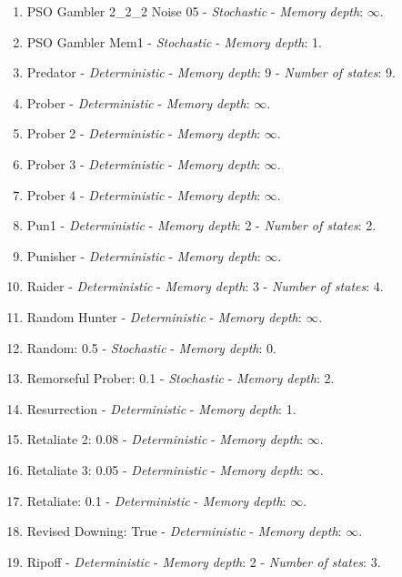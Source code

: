 \documentclass[10pt,letterpaper]{article}
\begin{document}
\begin{enumerate}
\item PSO Gambler 2\_2\_2 Noise 05 - \textit{Stochastic} - \textit{Memory depth}: \(\infty\). \cite{axelrodproject}
\item PSO Gambler Mem1 - \textit{Stochastic} - \textit{Memory depth}: 1. \cite{axelrodproject}
\item Predator - \textit{Deterministic} - \textit{Memory depth}: 9 - \textit{Number of states}: 9. \cite{Ashlock2006}
\item Prober - \textit{Deterministic} - \textit{Memory depth}: \(\infty\). \cite{Li2011}
\item Prober 2 - \textit{Deterministic} - \textit{Memory depth}: \(\infty\). \cite{Prison1998}
\item Prober 3 - \textit{Deterministic} - \textit{Memory depth}: \(\infty\). \cite{Prison1998}
\item Prober 4 - \textit{Deterministic} - \textit{Memory depth}: \(\infty\). \cite{Prison1998}
\item Pun1 - \textit{Deterministic} - \textit{Memory depth}: 2 - \textit{Number of states}: 2. \cite{Ashlock2006}
\item Punisher - \textit{Deterministic} - \textit{Memory depth}: \(\infty\). \cite{axelrodproject}
\item Raider - \textit{Deterministic} - \textit{Memory depth}: 3 - \textit{Number of states}: 4. \cite{Ashlock2014}
\item Random Hunter - \textit{Deterministic} - \textit{Memory depth}: \(\infty\). \cite{axelrodproject}
\item Random: 0.5 - \textit{Stochastic} - \textit{Memory depth}: 0. \cite{Axelrod1980a, Tzafestas2000}
\item Remorseful Prober: 0.1 - \textit{Stochastic} - \textit{Memory depth}: 2. \cite{Li2011}
\item Resurrection - \textit{Deterministic} - \textit{Memory depth}: 1. \cite{Eckhart2015}
\item Retaliate 2: 0.08 - \textit{Deterministic} - \textit{Memory depth}: \(\infty\). \cite{axelrodproject}
\item Retaliate 3: 0.05 - \textit{Deterministic} - \textit{Memory depth}: \(\infty\). \cite{axelrodproject}
\item Retaliate: 0.1 - \textit{Deterministic} - \textit{Memory depth}: \(\infty\). \cite{axelrodproject}
\item Revised Downing: True - \textit{Deterministic} - \textit{Memory depth}: \(\infty\). \cite{Axelrod1980a}
\item Ripoff - \textit{Deterministic} - \textit{Memory depth}: 2 - \textit{Number of states}: 3. \cite{Ashlock2008}

\end{enumerate}
\end{document}
